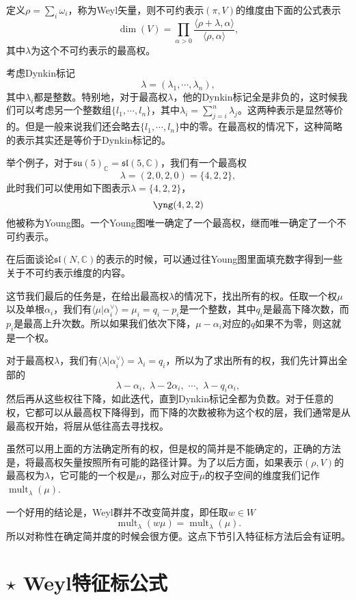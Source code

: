 \documentclass[10pt]{article}
\newcommand{\cc}{\mathbb{C}}
\DeclareMathOperator{\mult}{mult}
\begin{document}
定义$\rho=\sum_i \omega_i$，称为Weyl矢量，则不可约表示$(\pi,V)$的维度由下面的公式表示
\[
	\dim(V)=\prod_{\alpha>0}\frac{\langle \rho+\lambda,\alpha\rangle}{\langle \rho,\alpha\rangle},
\]
其中$\lambda$为这个不可约表示的最高权。

\para 考虑Dynkin标记
\[
	\lambda=(\lambda_1,\cdots,\lambda_n),
\]
其中$\lambda_i$都是整数。特别地，对于最高权$\lambda$，他的Dynkin标记全是非负的，这时候我们可以考虑另一个整数组$\{l_1,\cdots,l_n\}$，其中$\lambda_i=\sum_{j=i}^n\lambda_j$。这两种表示是显然等价的。但是一般来说我们还会略去$\{l_1,\cdots,l_n\}$中的零。在最高权的情况下，这种简略的表示其实还是等价于Dynkin标记的。

举个例子，对于$\mathfrak{su}(5)_\cc=\mathfrak{sl}(5,\cc)$，我们有一个最高权
\[
	\lambda=(2,0,2,0)=\{4,2,2\},
\]
此时我们可以使用如下图表示$\lambda=\{4,2,2\}$，
\[
	\yng(4,2,2)
\]
他被称为Young图。一个Young图唯一确定了一个最高权，继而唯一确定了一个不可约表示。

在后面谈论$\mathfrak{sl}(N,\cc)$的表示的时候，可以通过往Young图里面填充数字得到一些关于不可约表示维度的内容。

\para 这节我们最后的任务是，在给出最高权$\lambda$的情况下，找出所有的权。任取一个权$\mu$以及单根$\alpha_i$，我们有$\langle\mu|\alpha^\vee_i\rangle=\mu_i=q_i-p_i$是一个整数，其中$q_i$是最高下降次数，而$p_i$是最高上升次数。所以如果我们依次下降，$\mu-\alpha_i$对应的$q$如果不为零，则这就是一个权。

对于最高权$\lambda$，我们有$\langle\lambda|\alpha^\vee_i\rangle=\lambda_i=q_i$，所以为了求出所有的权，我们先计算出全部的
\[
	\lambda-\alpha_i,\,\,\lambda-2\alpha_i,\,\,\cdots,\,\,\lambda-q_i\alpha_i,
\]
然后再从这些权往下降，如此迭代，直到Dynkin标记全都为负数。对于任意的权，它都可以从最高权下降得到，而下降的次数被称为这个权的层，我们通常是从最高权开始，将层从低往高去寻找权。

\para 虽然可以用上面的方法确定所有的权，但是权的简并是不能确定的，正确的方法是，将最高权矢量按照所有可能的路径计算。为了以后方面，如果表示$(\rho,V)$的最高权为$\lambda$，它可能的一个权是$\mu$，那么对应于$\mu$的权子空间的维度我们记作$\mult_\lambda(\mu)$.

一个好用的结论是，Weyl群并不改变简并度，即任取$w\in W$
\[
	\mult_\lambda(w\mu)=\mult_\lambda(\mu).
\]
所以对称性在确定简并度的时候会很方便。这点下节引入特征标方法后会有证明。

\section{ $\star$ Weyl特征标公式}
\end{document}
